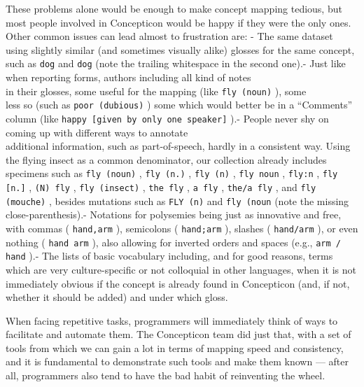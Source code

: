 \documentclass[
  a4paper,
  14pt,
  oneside,
  tablecaptionabove
]{scrbook}
\newcommand{\passthrough}[1]{#1}
\begin{document}
These problems alone would be enough to make concept mapping tedious,
but most people involved in Concepticon would be happy if they were the
only ones. Other common issues can lead almost to frustration are: - The
same dataset using slightly similar (and sometimes visually alike)
glosses for the same concept, such as \passthrough{\lstinline!dog!} and
\passthrough{\lstinline!dog!} (note the trailing whitespace in the
second one).- Just like when reporting forms, authors including all kind
of notes\\
in their glosses, some useful for the mapping (like
\passthrough{\lstinline!fly (noun)!} ), some\\
less so (such as \passthrough{\lstinline!poor (dubious)!} ) some which
would better be in a \enquote{Comments} column (like
\passthrough{\lstinline!happy [given by only one speaker]!} ).- People
never shy on coming up with different ways to annotate\\
additional information, such as part-of-speech, hardly in a consistent
way. Using the flying insect as a common denominator, our collection
already includes specimens such as \passthrough{\lstinline!fly (noun)!}
, \passthrough{\lstinline!fly (n.)!} , \passthrough{\lstinline!fly (n)!}
, \passthrough{\lstinline!fly noun!} , \passthrough{\lstinline!fly:n!} ,
\passthrough{\lstinline!fly [n.]!} , \passthrough{\lstinline!(N) fly!} ,
\passthrough{\lstinline!fly (insect)!} ,
\passthrough{\lstinline!the fly!} , \passthrough{\lstinline!a fly!} ,
\passthrough{\lstinline!the/a fly!} , and
\passthrough{\lstinline!fly (mouche)!} , besides mutations such as
\passthrough{\lstinline!FLY (n)!} and
\passthrough{\lstinline!fly (noun!} (note the missing
close-parenthesis).- Notations for polysemies being just as innovative
and free, with commas ( \passthrough{\lstinline!hand,arm!} ), semicolons
( \passthrough{\lstinline!hand;arm!} ), slashes (
\passthrough{\lstinline!hand/arm!} ), or even nothing (
\passthrough{\lstinline!hand arm!} ), also allowing for inverted orders
and spaces (e.g., \passthrough{\lstinline!arm / hand!} ).- The lists of
basic vocabulary including, and for good reasons, terms which are very
culture-specific or not colloquial in other languages, when it is not
immediately obvious if the concept is already found in Concepticon (and,
if not, whether it should be added) and under which gloss.

When facing repetitive tasks, programmers will immediately think of ways
to facilitate and automate them. The Concepticon team did just that,
with a set of tools from which we can gain a lot in terms of mapping
speed and consistency, and it is fundamental to demonstrate such tools
and make them known --- after all, programmers also tend to have the bad
habit of reinventing the wheel.
\end{document}
